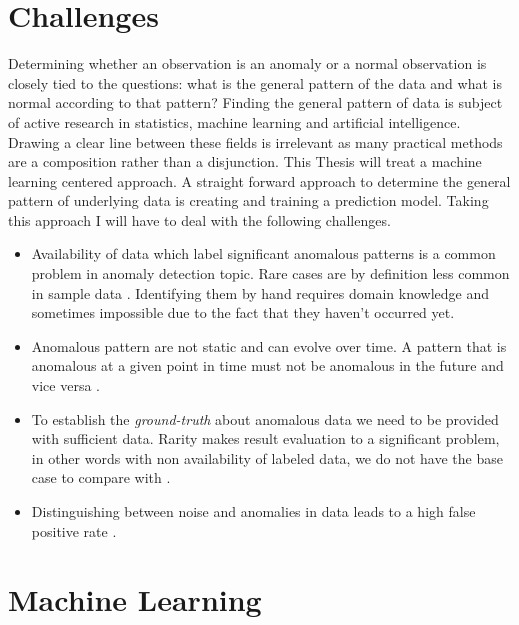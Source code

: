 \section{Challenges}
Determining whether an observation is an anomaly or a normal observation is closely tied to the questions: what is the general pattern of the data and what is normal according to that pattern? Finding the general pattern of data is subject of active research in statistics, machine learning and artificial intelligence. Drawing a clear line between these fields is irrelevant as many practical methods are a composition rather than a disjunction. This Thesis will treat a machine learning centered approach. A straight forward approach to determine the general pattern of underlying data is creating and training a prediction model. Taking this approach I will have to deal with the following challenges.


\begin{itemize}
    \item Availability of data which label significant anomalous patterns is a common problem in anomaly detection topic. Rare cases are by definition less common in sample data \cite{Weiss:2004:MRU:1007730.1007734}. Identifying them by hand requires domain knowledge and sometimes impossible due to the fact that they haven't occurred yet.
    
    \item Anomalous pattern are not static and can evolve over time. A pattern that is anomalous at a given point in time must not be anomalous in the future and vice versa \cite{Chandola:2009:ADS:1541880.1541882}.
    
    \item To establish the \textit{ground-truth} about anomalous data we need to be provided with sufficient data. Rarity makes result evaluation to a significant problem, in other words with non availability of labeled data, we do not have the base case to compare with \cite{Aggarwal:2013}. %
    
    \item Distinguishing between noise and anomalies in data leads to a high false positive rate \cite{Chandola:2009:ADS:1541880.1541882}.   %
    
\end{itemize}

\section{Machine Learning} 

